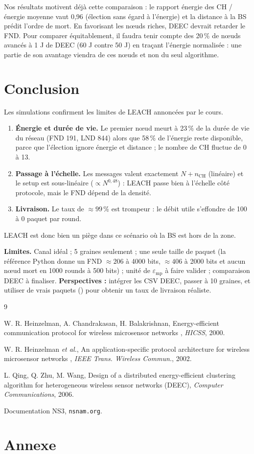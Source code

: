 \documentclass[11pt,a4paper]{article}
\newcommand{\pct}{\,\%}
\newcommand{\code}[1]{\texttt{\detokenize{#1}}}
\newcommand{\nCH}{n_{\mathrm{CH}}}
\begin{document}
Nos résultats motivent déjà cette comparaison : le rapport énergie des CH / énergie moyenne vaut 0,96 (élection sans égard à l'énergie) et la distance à la BS prédit l'ordre de mort. En favorisant les nœuds riches, DEEC devrait retarder le FND.
Pour comparer équitablement, il faudra tenir compte des 20\pct{} de nœuds avancés à 1 J de DEEC (60 J contre 50 J) en traçant l'énergie normalisée : une partie de son avantage viendra de ces nœuds et non du seul algorithme.

\section{Conclusion}
Les simulations confirment les limites de LEACH annoncées par le cours.
\begin{enumerate}
\item \textbf{Énergie et durée de vie.} Le premier nœud meurt à 23\pct{} de la durée de vie du réseau (FND 191, LND 844) alors que 58\pct{} de l'énergie reste disponible, parce que l'élection ignore énergie et distance ; le nombre de CH fluctue de 0 à 13.
\item \textbf{Passage à l'échelle.} Les messages valent exactement $N+\nCH$ (linéaire) et le setup est sous-linéaire ($\propto N^{0{,}48}$) : LEACH passe bien à l'échelle côté protocole, mais le FND dépend de la densité.
\item \textbf{Livraison.} Le taux de $\approx99\pct$ est trompeur : le débit utile s'effondre de 100 à 0 paquet par round.
\end{enumerate}
LEACH est donc bien \og un piège \fg{} dans ce scénario où la BS est hors de la zone.

\textbf{Limites.} Canal idéal ; 5 graines seulement ; une seule taille de paquet (la référence Python donne un FND $\approx206$ à 4000 bits, $\approx406$ à 2000 bits et aucun nœud mort en 1000 rounds à 500 bits) ;
unité de $\varepsilon_{\mathrm{mp}}$ à faire valider ; comparaison DEEC à finaliser. \textbf{Perspectives :} intégrer les CSV DEEC, passer à 10 graines, et utiliser de vrais paquets (\code{lr-wpan}) pour obtenir un taux de livraison réaliste.

\begin{thebibliography}{9}\footnotesize\setlength{\itemsep}{0pt}
\item[{[1]}] W. R. Heinzelman, A. Chandrakasan, H. Balakrishnan, \og Energy-efficient communication protocol for wireless microsensor networks \fg, \textit{HICSS}, 2000.
\item[{[2]}] W. R. Heinzelman \textit{et al.}, \og An application-specific protocol architecture for wireless microsensor networks \fg, \textit{IEEE Trans. Wireless Commun.}, 2002.
\item[{[3]}] L. Qing, Q. Zhu, M. Wang, \og Design of a distributed energy-efficient clustering algorithm for heterogeneous wireless sensor networks \fg{} (DEEC), \textit{Computer Communications}, 2006.
\item[{[4]}] Documentation NS3, \texttt{nsnam.org}.
\end{thebibliography}

\section*{Annexe}
\begingroup
{}
\endgroup
\end{document}
